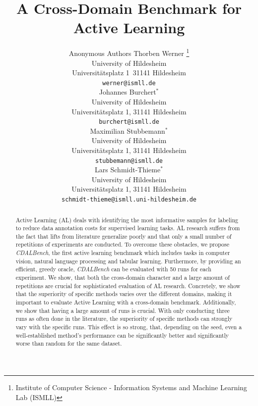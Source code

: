 \documentclass[]{article}
\title{A Cross-Domain Benchmark for Active Learning}
\author{%
	Anonymous Authors
	Thorben Werner 
	\thanks{Institute of Computer Science - Information Systems and Machine Learning Lab (ISMLL)} 
	\\
	University of Hildesheim\\
	Universitätsplatz 1\, 31141 Hildesheim \\
	\texttt{werner@ismll.de} \\
	\And
	Johannes Burchert$^*$ \\
	University of Hildesheim\\
	Universitätsplatz 1, 31141 Hildesheim \\
	\texttt{burchert@ismll.de} \\
	\And
	Maximilian Stubbemann$^*$ \\
	University of Hildesheim\\
	Universitätsplatz 1, 31141 Hildesheim \\
	\texttt{stubbemann@ismll.de} \\
	\AND
	Lars Schmidt-Thieme$^*$ \\
	University of Hildesheim\\
	Universitätsplatz 1, 31141 Hildesheim \\
	\texttt{schmidt-thieme@ismll.uni-hildesheim.de}
}
\begin{document}
	


\maketitle


\begin{abstract}

Active Learning (AL) deals with identifying the most informative samples for
labeling to reduce data annotation costs for supervised learning tasks. AL
research suffers from the fact that lifts from literature generalize poorly and
that only a small number of repetitions of experiments are conducted. To overcome
these obstacles, we propose \emph{CDALBench}, the first active learning benchmark
which includes tasks in computer vision, natural language processing and tabular
learning. Furthermore, by providing an efficient, greedy oracle, \emph{CDALBench}
can be evaluated with 50 runs for each experiment. We show, that both the
cross-domain character and a large amount of repetitions are crucial for
sophisticated evaluation of AL research. Concretely, we show that the
superiority of specific methods varies over the different domains, making it
important to evaluate Active Learning with a cross-domain benchmark.
Additionally, we show that having a large amount of runs is crucial. With only
conducting three runs as often done in the literature, the superiority of
specific methods can strongly vary with the specific runs. This effect is so strong, that, depending on the seed, even a well-established method's performance can be significantly better and significantly
worse than random for the same dataset. 
\end{abstract}

\end{document}
